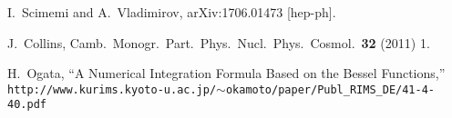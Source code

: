 \documentclass[10pt,a4paper]{article}
\begin{document}
\begin{thebibliography}{alp}

  I.~Scimemi and A.~Vladimirov,
  arXiv:1706.01473 [hep-ph].

  J.~Collins,
  Camb.\ Monogr.\ Part.\ Phys.\ Nucl.\ Phys.\ Cosmol.\  {\bf 32} (2011) 1.

  H.~Ogata,
  ``A Numerical Integration Formula Based on the Bessel Functions,''
  \texttt{http://www.kurims.kyoto-u.ac.jp/$\sim$okamoto/paper/Publ\_RIMS\_DE/41-4-40.pdf}

\end{thebibliography}
\end{document}
